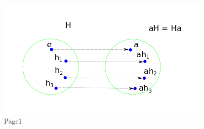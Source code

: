 \begin{figure}[H]
\centering
\includegraphics[scale=0.7]{images/groups_10_1.png}
\caption{Page1}
\end{figure}
